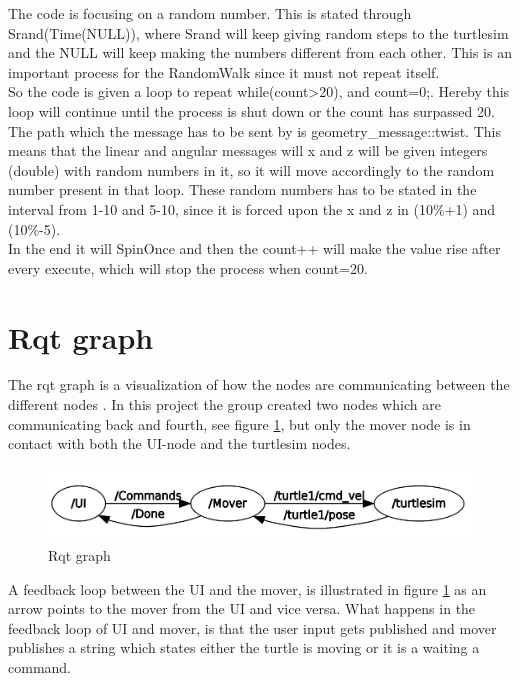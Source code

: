 The code is focusing on a random number. This is stated through Srand(Time(NULL)), where Srand will keep giving random steps to the turtlesim and the NULL will keep making the numbers different from each other. This is an important process for the RandomWalk since it must not repeat itself.\\
So the code is given a loop to repeat while(count>20), and count=0;. Hereby this loop will continue until the process is shut down or the count has surpassed 20.\\
The path which the message has to be sent by is geometry\_message::twist. This means that the linear and angular messages will x and z will be given integers (double) with random numbers in it, so it will move accordingly to the random number present in that loop. These random numbers has to be stated in the interval from 1-10 and 5-10, since it is forced upon the x and z in (10\%+1) and (10\%-5).\\
In the end it will SpinOnce and then the count++ will make the value rise after every execute, which will stop the process when count=20.\\

\section{Rqt graph}

The rqt graph is a visualization of how the nodes are communicating between the different nodes . In this project the group created two nodes which are communicating back and fourth, see figure \ref{fig:rqt}, but only the mover node is in contact with both the UI-node and the turtlesim nodes.\\


\begin{figure}[h]
\begin{center}
\includegraphics[width=.8\textwidth]{figures/rqt-turtlesim.png}
\caption{Rqt graph}\label{fig:rqt}
\end{center}
\end{figure}

A feedback loop between the UI and the mover, is illustrated in figure \ref{fig:rqt} as an arrow points to the mover from the UI and vice versa. What happens in the feedback loop of UI and mover, is that the user input gets published and mover publishes a string which states either the turtle is moving or it is a waiting a command.\\